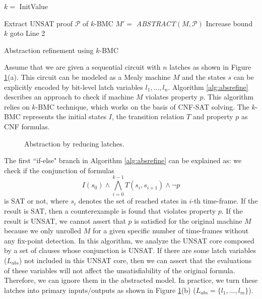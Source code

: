 \begin{algorithm}[htb]
\SetAlgoNoLine
\LinesNumbered
  $k = $ InitValue\;
  
  {
  }
  {
	Extract UNSAT proof $\mathcal P$ of $k$-BMC\;
	$M' = $ \textit{ABSTRACT}$(M,\mathcal P)$\;
  }
  {
  }
  {
	Increase bound $k$\;
	goto Line 2\;
  }
\caption {Abstraction refinement using $k$-BMC}\label{alg:absrefine}
\end{algorithm}

Assume that we are given a sequential circuit with $n$ latches as shown in Figure \ref{fig:absrefine}(a). 
This circuit can be modeled as a Mealy machine $M$ and the states $s$ can be explicitly encoded by bit-level latch variables 
$l_1,\dots,l_n$. Algorithm \ref{alg:absrefine} describes an approach to check if machine $M$ violates property $p$.
This algorithm relies on $k$-BMC technique, which works on the basis of CNF-SAT solving.
The $k$-BMC represents the initial states $I$, the transition relation $T$ and property $p$ as CNF formulas.

\begin{figure}[bp]
\caption{Abstraction by reducing latches.}
\label{fig:absrefine}
\end{figure}

The first ``if-else" branch in Algorithm \ref{alg:absrefine} can be
explained as: we check if the conjunction of formulas 
$$I(s_0)\land \bigwedge_{i=0}^{k-1}T(s_i,s_{i+1}) \land \neg p$$
is SAT or not, where $s_i$ denotes the set of reached states in $i$-th time-frame. If the result is
SAT, then a counterexample is found that violates property $p$. If the result is UNSAT, we cannot
assert that $p$ is satisfied for the original machine $M$ because we only unrolled $M$ for a given specific number of time-frames
without any fix-point detection.
In this algorithm, we analyze the UNSAT core composed by a set of clauses whose conjunction is UNSAT.
If there are some latch variables ($L_{abs}$) not included in this UNSAT core, then we can assert that the evaluations of 
these variables will not affect the unsatisfiability of the original formula. Therefore, we can ignore them in the abstracted model.
In practice, we turn these latches into primary inputs/outputs as shown in Figure \ref{fig:absrefine}(b) ($L_{abs} = \{l_1,\dots,l_m\}$).


